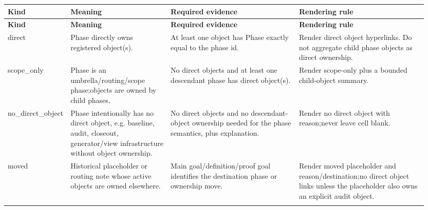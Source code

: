 \small
{}
\begin{longtable}{L{0.075\linewidth} L{0.245\linewidth} L{0.315\linewidth} L{0.315\linewidth}}
\hline
\textbf{Kind} & \textbf{Meaning} & \textbf{Required evidence} & \textbf{Rendering rule}\\
\hline
\endfirsthead
\hline
\textbf{Kind} & \textbf{Meaning} & \textbf{Required evidence} & \textbf{Rendering rule}\\
\hline
\endhead
direct & Phase directly owns registered object(s). & At least one object has Phase exactly equal to the phase id. & Render direct object hyperlinks. Do not aggregate child phase objects as direct ownership.\\
\hline
\addlinespace[0.24em]
scope\_only & Phase is an umbrella/\allowbreak{}routing/\allowbreak{}scope phase;\newline objects are owned by child phases. & No direct objects and at least one descendant phase has direct object(s). & Render scope-only plus a bounded child-object summary.\\
\hline
\addlinespace[0.24em]
no\_direct\_object & Phase intentionally has no direct object, e.g. baseline, audit, closeout, generator/\allowbreak{}view infrastructure without object ownership. & No direct objects and no descendant-object ownership needed for the phase semantics, plus explanation. & Render no direct object with reason;\newline never leave cell blank.\\
\hline
\addlinespace[0.24em]
moved & Historical placeholder or routing note whose active objects are owned elsewhere. & Main goal/\allowbreak{}definition/\allowbreak{}proof goal identifies the destination phase or ownership move. & Render moved placeholder and reason/\allowbreak{}destination;\newline no direct object links unless the placeholder also owns an explicit audit object.\\
\hline
\addlinespace[0.24em]
\end{longtable}
\normalsize

